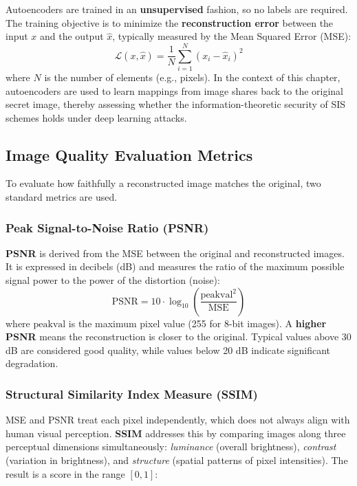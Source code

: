 Autoencoders are trained in an \textbf{unsupervised} fashion, so no labels are required. The training objective is to minimize the \textbf{reconstruction error} between the input $x$ and the output $\hat{x}$, typically measured by the Mean Squared Error (MSE):
\begin{equation}
\mathcal{L}(x, \hat{x}) = \frac{1}{N} \sum_{i=1}^{N} (x_i - \hat{x}_i)^2
\end{equation}
where $N$ is the number of elements (e.g., pixels). In the context of this chapter, autoencoders are used to learn mappings from image shares back to the original secret image, thereby assessing whether the information-theoretic security of SIS schemes holds under deep learning attacks.

\subsection{Image Quality Evaluation Metrics}

To evaluate how faithfully a reconstructed image matches the original, two standard metrics are used.

\subsubsection{Peak Signal-to-Noise Ratio (PSNR)}

\textbf{PSNR} is derived from the MSE between the original and reconstructed images. It is expressed in decibels (dB) and measures the ratio of the maximum possible signal power to the power of the distortion (noise):
\begin{equation}
\text{PSNR} = 10 \cdot \log_{10}\!\left(\frac{\text{peakval}^2}{\text{MSE}}\right)
\end{equation}
where $\text{peakval}$ is the maximum pixel value (255 for 8-bit images). A \textbf{higher PSNR} means the reconstruction is closer to the original. Typical values above 30 dB are considered good quality, while values below 20 dB indicate significant degradation.

\subsubsection{Structural Similarity Index Measure (SSIM)}

MSE and PSNR treat each pixel independently, which does not always align with human visual perception. \textbf{SSIM} addresses this by comparing images along three perceptual dimensions simultaneously: \emph{luminance} (overall brightness), \emph{contrast} (variation in brightness), and \emph{structure} (spatial patterns of pixel intensities). The result is a score in the range $[0, 1]$:

